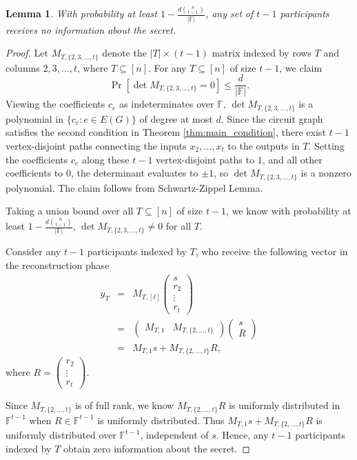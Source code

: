 \documentclass[11pt]{article}
\newtheorem{lemma}{Lemma}
\begin{document}
\begin{lemma}
\label{lem:zero_info}
With probability at least $1 - \frac{d \binom{n}{t-1}}{|\mathbb{F}|}$, any set of $t-1$ participants receives no information about the secret.
\end{lemma}
\begin{proof} 
Let $M_{T, \{2,3,\ldots,t\}}$ denote the $|T| \times (t-1)$ matrix indexed by rows $T$ and columns $2, 3, \ldots, t$, where $T \subseteq [n]$. For any $T \subseteq [n]$ of size $t-1$, we claim
\[
\Pr[\det M_{T, \{2,3,\ldots,t\}} = 0] \le \frac{d}{|\mathbb{F}|}.
\]
Viewing the coefficients $c_e$ as indeterminates over $\mathbb{F}$, $\det M_{T, \{2,3,\ldots,t\}}$ is a polynomial in $\{c_e : e \in E(G)\}$ of degree at most $d$. Since the circuit graph satisfies the second condition in Theorem \ref{thm:main_condition}, there exist $t-1$ vertex-disjoint paths connecting the inputs $x_2, \ldots, x_t$ to the outputs in $T$.
Setting the coefficients $c_e$ along these $t-1$ vertex-disjoint paths to $1$, and all other coefficients to $0$, the determinant evaluates to $\pm 1$, so $\det M_{T, \{2,3,\ldots,t\}}$ is a nonzero polynomial.
The claim follows from Schwartz-Zippel Lemma.

Taking a union bound over all $T \subseteq [n]$ of size $t-1$, we know with probability at least $1 - \frac{d{n \choose t-1}}{|\mathbb{F}|}$, $\det M_{T, \{2,3,\ldots,t\}} \not= 0$ for all $T$.

Consider any $t-1$ participants indexed by $T$, who receive the following vector in the reconstruction phase
\begin{eqnarray*}
y_T & = & M_{T, [t]} \begin{pmatrix}
s \\
r_2 \\
\vdots \\
r_t
\end{pmatrix} \\
& = & 
\begin{pmatrix}
M_{T,1} & M_{T, \{2, \ldots, t\}}
\end{pmatrix}
\begin{pmatrix}
s \\
R
\end{pmatrix} \\
& = &
M_{T, 1}s + M_{T, \{2, \ldots, t\}}R,
\end{eqnarray*}
where $R = \begin{pmatrix}
r_2 \\
\vdots \\
r_t
\end{pmatrix}$. 

Since $M_{T, \{2, \ldots, t\}}$ is of full rank, we know $M_{T, \{2, \ldots, t\}}R$ is uniformly distributed in $\mathbb{F}^{t-1}$ when $R \in \mathbb{F}^{t-1}$ is uniformly distributed.
Thus $M_{T, 1}s + M_{T, \{2, \ldots, t\}}R$ is uniformly distributed over $\mathbb{F}^{t-1}$, independent of $s$. Hence, any $t-1$ participants indexed by $T$ obtain zero information about the secret.
\end{proof}
\end{document}
